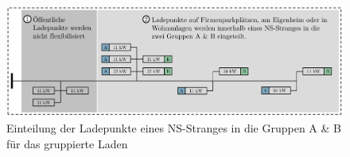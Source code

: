 \begin{figure}[H]
    \centering
    \includegraphics[width=\textwidth]{Bilder/grouped_charging_vis_cropped}
    \caption{Einteilung der Ladepunkte eines NS-Stranges in die Gruppen A \& B für das gruppierte Laden}\label{fig:group_vis}
\end{figure}